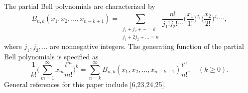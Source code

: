 \documentclass[a4paper,11pt]{amsart}
\begin{document}
The partial Bell polynomials are characterized by
\begin{equation*}
B_{n,k}(x_{1},x_{2},\dots,x_{n-k+1})=\sum_{\substack{j_{1}+j_{2}+\cdots=k \\ j_{1}+2j_{2}+\dots=n}}\frac{n!}{j_{1}!j_{2}!\cdots}\Big(\frac{x_{1}}{1!} \Big)^{j_{1}}\Big(\frac{x_{2}}{2!}\Big)^{j_{2}}\cdots,
\end{equation*}
where $j_{1}, j_{2}, \dots$ are nonnegative integers. The generating function of the partial Bell polynomials is specified as
\begin{equation} \label{19}
\frac{1}{k!}\bigg(\sum_{m=1}^{\infty}x_{m}\frac{t^{m}}{m!}\bigg)^{k}=\sum_{n=k}^{\infty}B_{n,k}(x_{1},x_{2},\dots,x_{n-k+1})\frac{t^{n}}{n!}, \quad (k \ge 0).
\end{equation}
General references for this paper include [6,23,24,25].
\end{document}
